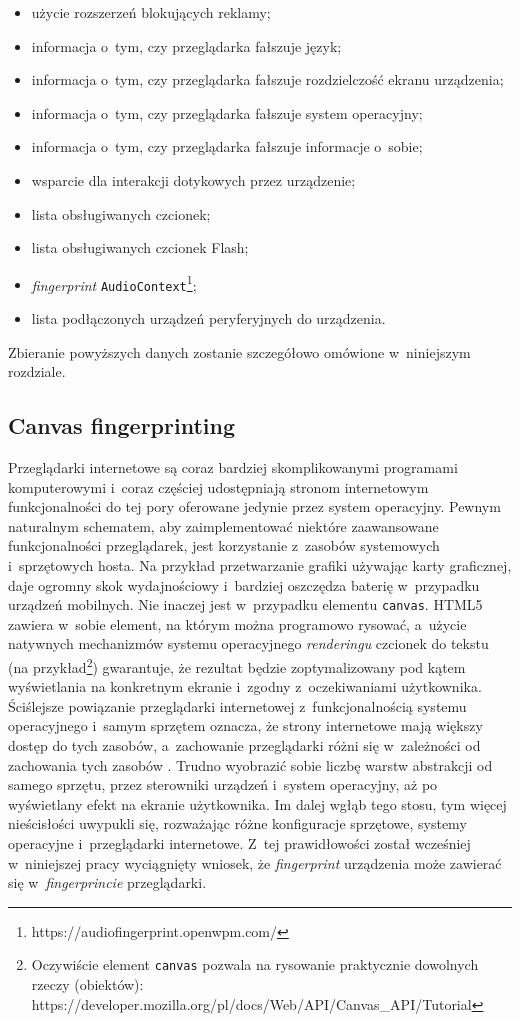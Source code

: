 \begin{itemize}
	\item użycie rozszerzeń blokujących reklamy;
	\item informacja o~tym, czy przeglądarka fałszuje język;
	\item informacja o~tym, czy przeglądarka fałszuje rozdzielczość ekranu
	      urządzenia;
	\item informacja o~tym, czy przeglądarka fałszuje system operacyjny;
	\item informacja o~tym, czy przeglądarka fałszuje informacje o~sobie;
	\item wsparcie dla interakcji dotykowych przez urządzenie;
	\item lista obsługiwanych czcionek;
	\item lista obsługiwanych czcionek Flash;
	\item \emph{fingerprint}
	      \texttt{AudioContext}\footnote{https://audiofingerprint.openwpm.com/};
	\item lista podłączonych urządzeń peryferyjnych do urządzenia.
\end{itemize}

Zbieranie powyższych danych zostanie szczegółowo omówione w~niniejszym
rozdziale.

\subsection{Canvas fingerprinting}
Przeglądarki internetowe są coraz bardziej skomplikowanymi programami
komputerowymi i~coraz częściej udostępniają stronom internetowym funkcjonalności
do tej pory oferowane jedynie przez system operacyjny. Pewnym naturalnym
schematem, aby zaimplementować niektóre zaawansowane funkcjonalności
przeglądarek, jest korzystanie z~zasobów systemowych i~sprzętowych hosta. Na
przykład przetwarzanie grafiki używając karty graficznej, daje ogromny skok
wydajnościowy i~bardziej oszczędza baterię w~przypadku urządzeń mobilnych. Nie
inaczej jest w~przypadku elementu \texttt{canvas}. HTML5 zawiera w~sobie
element, na którym można programowo rysować, a~użycie natywnych mechanizmów
systemu operacyjnego \emph{renderingu} czcionek do tekstu (na
przykład\footnote{Oczywiście element \texttt{canvas} pozwala na rysowanie
	praktycznie dowolnych rzeczy (obiektów):
	https://developer.mozilla.org/pl/docs/Web/API/Canvas\_API/Tutorial})
gwarantuje, że rezultat będzie zoptymalizowany pod kątem wyświetlania na
konkretnym ekranie i~zgodny z~oczekiwaniami użytkownika. Ściślejsze powiązanie
przeglądarki internetowej z~funkcjonalnością systemu operacyjnego i~samym
sprzętem oznacza, że strony internetowe mają większy dostęp do tych zasobów,
a~zachowanie przeglądarki różni się w~zależności od zachowania tych zasobów
\cite[s. 1]{mowery2012pixel}. Trudno wyobrazić sobie liczbę warstw abstrakcji od
samego sprzętu, przez sterowniki urządzeń i~system operacyjny, aż po wyświetlany
efekt na ekranie użytkownika. Im dalej wgłąb tego stosu, tym więcej nieścisłości
uwypukli się, rozważając różne konfiguracje sprzętowe, systemy operacyjne
i~przeglądarki internetowe. Z~tej prawidłowości został wcześniej w~niniejszej
pracy wyciągnięty wniosek, że \emph{fingerprint} urządzenia może zawierać się
w~\emph{fingerprincie} przeglądarki.

